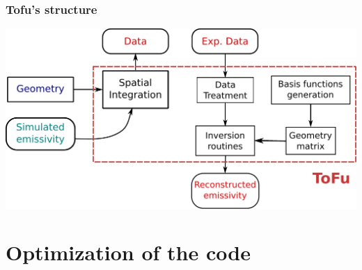 \documentclass[10pt]{beamer}
\begin{document}
\begin{frame}
\frametitle{Tofu's structure}

\begin{center}
    	\includegraphics[width=0.8\linewidth]{figures/tofu.pdf}
\end{center}
	
\end{frame}

\section{Optimization of the code}
\end{document}
